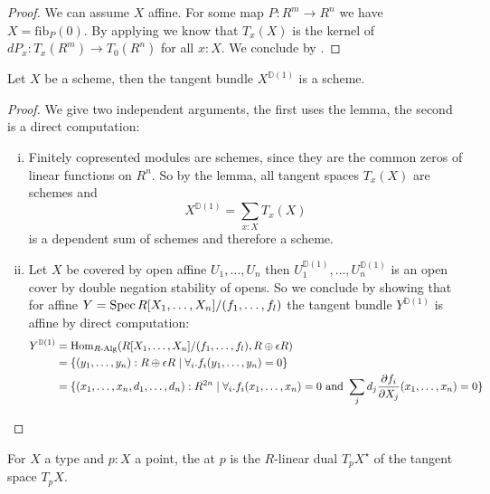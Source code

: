\begin{proof}
We can assume $X$ affine. For some map $P: R^m\to R^n$ we have $X=\mathrm{fib}_P(0)$.
By applying  we know that $T_x(X)$ is the kernel of $dP_x : T_x(R^m)\to T_0(R^n)$ for all $x:X$.
We conclude by .
\end{proof}

\begin{corollary}
  \label{tangent-bundle-scheme}
  Let $X$ be a scheme, then the tangent bundle $X^{\mathbb{D}(1)}$ is a scheme.
\end{corollary}

\begin{proof}
  We give two independent arguments, the first uses the lemma, the second is a direct computation:
  \begin{enumerate}[(i)]
  \item Finitely copresented modules are schemes, since they are the common zeros of linear functions on $R^n$.
    So by the lemma, all tangent spaces $T_x(X)$ are schemes and
    \[
      X^{\mathbb{D}(1)}=\sum_{x:X}T_x(X)
    \]
    is a dependent sum of schemes and therefore a scheme.
  \item Let $X$ be covered by open affine $U_1,\dots,U_n$ then $U_1^{\mathbb{D}(1)},\dots,U_n^{\mathbb{D}(1)}$ is an open cover by double negation stability of opens.
    So we conclude by showing that for affine $Y=\operatorname{Spec} R[X_1,\dots,X_n]/(f_1,\dots,f_l)$ the tangent bundle $Y^{\mathbb{D}(1)}$ is affine
    by direct computation:
    \begin{align*}
      Y^{\mathbb{D}(1)}&=\mathrm{Hom}_{R\text{-}\mathrm{Alg}}(R[X_1,\dots,X_n]/(f_1,\dots,f_l), R\oplus \epsilon R) \\
                       &= \{(y_1,\dots,y_n):R\oplus \epsilon R \mid \forall_i. f_i(y_1,\dots,y_n)=0\} \\
                       &= \{(x_1,\dots,x_n,d_1,\dots,d_n):R^{2n} \mid \forall_i. f_i(x_1,\dots,x_n)=0\text{ and } \sum_j d_j\frac{\partial f_i}{\partial X_j}(x_1,\dots,x_n) =0\} 
    \end{align*}
  \end{enumerate}
\end{proof}

\begin{definition}
For $X$ a type and $p : X$ a point, the  at $p$ is the
$R$-linear dual $T_p X^\star$ of the tangent space $T_p X$.
\end{definition}

